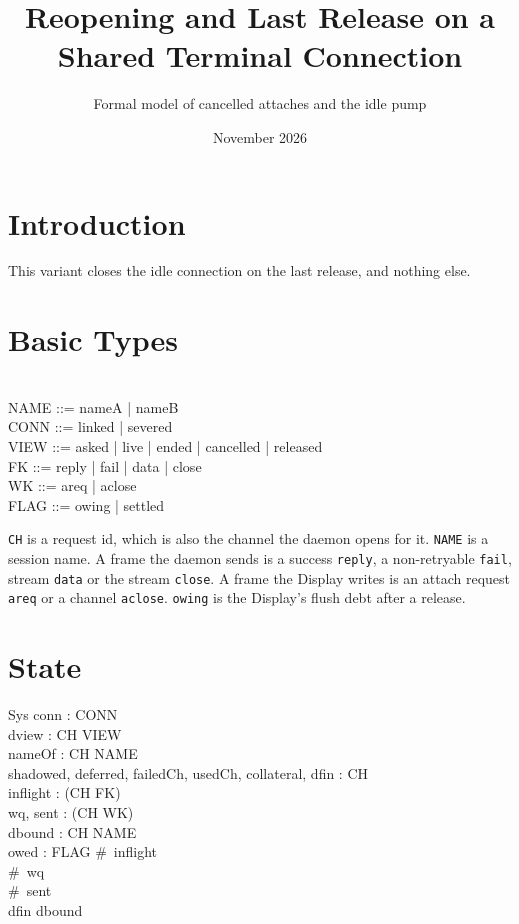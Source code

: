 \documentclass[a4paper,10pt,fleqn]{article}
\begin{document}
\title{Reopening and Last Release on a Shared Terminal Connection}
\author{Formal model of cancelled attaches and the idle pump}
\date{November 2026}
\maketitle

\section{Introduction}

This variant closes the idle connection on the last release, and nothing else.

\section{Basic Types}

\begin{zed}
  [CH] \\
  NAME ::= nameA | nameB \\
  CONN ::= linked | severed \\
  VIEW ::= asked | live | ended | cancelled | released \\
  FK ::= reply | fail | data | close \\
  WK ::= areq | aclose \\
  FLAG ::= owing | settled
\end{zed}

\texttt{CH} is a request id, which is also the channel the daemon opens for
it.  \texttt{NAME} is a session name.  A frame the daemon sends is a
success \texttt{reply}, a non-retryable \texttt{fail}, stream \texttt{data}
or the stream \texttt{close}.  A frame the Display writes is an attach
request \texttt{areq} or a channel \texttt{aclose}.  \texttt{owing} is the
Display's flush debt after a release.

\section{State}

\begin{schema}{Sys}
  conn : CONN \\
  dview : CH \pfun VIEW \\
  nameOf : CH \pfun NAME \\
  shadowed, deferred, failedCh, usedCh, collateral, dfin : \power CH \\
  inflight : \seq (CH \cross FK) \\
  wq, sent : \seq (CH \cross WK) \\
  dbound : CH \pfun NAME \\
  owed : FLAG
\where
  \#~inflight  \\
  \#~wq  \\
  \#~sent  \\
  dfin \subseteq \dom dbound
\end{schema}
\end{document}
